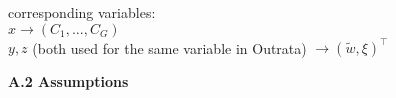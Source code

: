 
corresponding variables: \\
\(x \to (C_1,...,C_G)\) \\
\(y,z\) (both used for the same variable in Outrata) \(\to (\tilde{w},\xi)^{\top}\)

\textbf{A.2 Assumptions}


